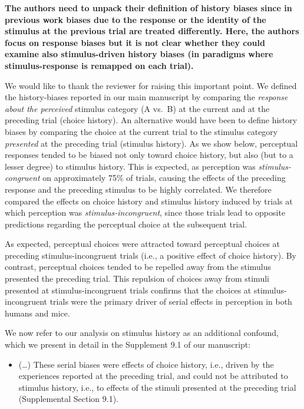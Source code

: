 \documentclass[
]{article}
\providecommand{\tightlist}{%
  \setlength{\itemsep}{0pt}\setlength{\parskip}{0pt}}
\begin{document}
\textbf{The authors need to unpack their definition of history biases
since in previous work biases due to the response or the identity of the
stimulus at the previous trial are treated differently. Here, the
authors focus on response biases but it is not clear whether they could
examine also stimulus-driven history biases (in paradigms where
stimulus-response is remapped on each trial).}

We would like to thank the reviewer for raising this important point. We
defined the history-biases reported in our main manuscript by comparing
the \emph{response about the perceived} stimulus category (A vs.~B) at
the current and at the preceding trial (choice history). An alternative
would have been to define history biases by comparing the choice at the
current trial to the stimulus category \emph{presented} at the preceding
trial (stimulus history). As we show below, perceptual responses tended
to be biased not only toward choice history, but also (but to a lesser
degree) to stimulus history. This is expected, as perception was
\emph{stimulus-congruent} on approximately 75\% of trials, causing the
effects of the preceding response and the preceding stimulus to be
highly correlated. We therefore compared the effects on choice history
and stimulus history induced by trials at which perception was
\emph{stimulus-incongruent}, since those trials lead to opposite
predictions regarding the perceptual choice at the subsequent trial.

As expected, perceptual choices were attracted toward perceptual choices
at preceding stimulus-incongruent trials (i.e., a positive effect of
choice history). By contrast, perceptual choices tended to be repelled
away from the stimulus presented the preceding trial. This repulsion of
choices away from stimuli presented at stimulus-incongruent trials
confirms that the choices at stimulus-incongruent trials were the
primary driver of serial effects in perception in both humans and mice.

We now refer to our analysis on stimulus history as an additional
confound, which we present in detail in the Supplement 9.1 of our
manuscript:

\begin{itemize}
\tightlist
\item
  (\ldots) These serial biases were effects of choice history, i.e.,
  driven by the experiences reported at the preceding trial, and could
  not be attributed to stimulus history, i.e., to effects of the stimuli
  presented at the preceding trial (Supplemental Section 9.1).
\end{itemize}
\end{document}
